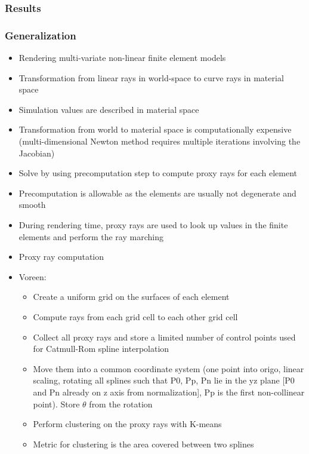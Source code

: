 \subsubsection{Results}
\label{contributions:medbio:fem:results}

\subsubsection{Generalization}
\label{contributions:medbio:fem:generalization}


\begin{itemize}
\item Rendering multi-variate non-linear finite element models
\item Transformation from linear rays in world-space to curve rays in material space
\item Simulation values are described in material space
\item Transformation from world to material space is computationally expensive (multi-dimensional Newton method requires multiple iterations involving the Jacobian)
\item Solve by using precomputation step to compute proxy rays for each element
\item Precomputation is allowable as the elements are usually not degenerate and smooth
\item During rendering time, proxy rays are used to look up values in the finite elements and perform the ray marching
\item Proxy ray computation
\item Voreen: \cite{meyer2009voreen}
\begin{itemize}
    \item Create a uniform grid on the surfaces of each element
    \item Compute rays from each grid cell to each other grid cell
    \item Collect all proxy rays and store a limited number of control points used for Catmull-Rom spline interpolation 
    \item Move them into a common coordinate system (one point into origo, linear scaling, rotating all splines such that P0, Pp, Pn lie in the yz plane [P0 and Pn already on z axis from normalization], Pp is the first non-collinear point). Store $\theta$ from the rotation
    \item Perform clustering on the proxy rays \cite{abraham03clustering} with K-means \cite{hartigan75kmeans}
    \item Metric for clustering is the area covered between two splines

\end{itemize}
\end{itemize}
